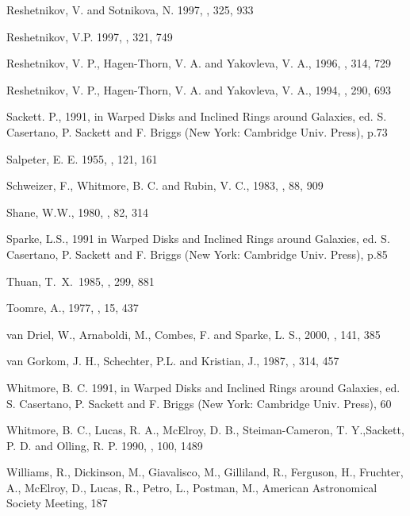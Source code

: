 \documentclass{aa}
\begin{document}
\begin{thebibliography}{}
 Reshetnikov, V. and Sotnikova, N. 1997, \aap, 325, 933
                                   
  Reshetnikov, V.P. 1997, \aap, 321, 749 

 Reshetnikov, V. P.,
Hagen-Thorn, V. A. and Yakovleva, V. A., 1996, \aap, 314, 729

 Reshetnikov, V. P.,
Hagen-Thorn, V. A. and Yakovleva, V. A., 1994, \aap, 290, 693

 Sackett. P., 1991, in 
Warped Disks and Inclined Rings around Galaxies, ed. S. Casertano, P. Sackett 
and F. Briggs (New York: Cambridge Univ. Press), p.73         

 Salpeter, E. E. 1955, \apj, 121, 161 

 Schweizer, F., Whitmore, B. C. and Rubin, V. C., 1983,
\aj, 88, 909

 Shane, W.W., 1980, \aap, 82, 314   

 Sparke, L.S., 1991 in
Warped Disks and Inclined Rings around Galaxies,
ed. S. Casertano, P. Sackett and F. Briggs (New York: Cambridge Univ. Press), 
p.85  

 Thuan, T.\ X.\ 1985, \apj, 299, 881          

 Toomre, A., 1977, \araa, 15, 437  
                                                             
 van Driel, W., Arnaboldi, M.,
 Combes, F. and Sparke, L. S., 2000, \aaps, 141, 385

 van Gorkom, J. H., Schechter, P.L.
and Kristian, J., 1987, \apj, 314, 457

 Whitmore, B. C. 1991, in Warped Disks and Inclined Rings
around Galaxies, ed. S. Casertano, P. Sackett and F. Briggs 
(New York: Cambridge Univ. Press), 60

 Whitmore, B. C., Lucas, R. A., McElroy, D. B., 
Steiman-Cameron, T. Y.,Sackett, P. D. and Olling, R. P. 1990, \aj, 100, 1489

 Williams, R., Dickinson, M.,
Giavalisco, M., Gilliland, R., Ferguson, H., Fruchter, A., McElroy, D., Lucas, R.,
Petro, L., Postman, M., American Astronomical Society Meeting, 187 

\end{thebibliography}
\end{document}
